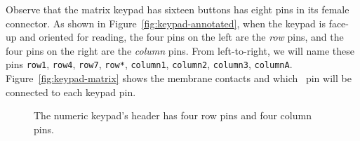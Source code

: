 
Observe that the matrix keypad has sixteen buttons has eight pins in its female connector.
As shown in Figure~\ref{fig:keypad-annotated}, when the keypad is face-up and oriented for reading, the four pins on the left are the \textit{row} pins, and the four pins on the right are the \textit{column} pins.
From left-to-right, we will name these pins \texttt{row1}, \texttt{row4}, \texttt{row7}, \texttt{row*}, \texttt{column1}, \texttt{column2}, \texttt{column3}, \texttt{columnA}.
Figure~\ref{fig:keypad-matrix} shows the membrane contacts and which \developmentboard\ pin will be connected to each keypad pin.


\begin{figure}
    \centering
    \hfil
    \caption{The numeric keypad's header has four row pins and four column pins.}
\end{figure}

